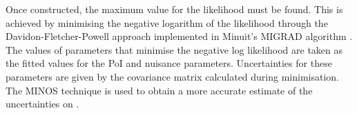 Once constructed, the maximum value for the likelihood must be found. This is
achieved by minimising the negative logarithm of the likelihood through the
Davidon-Fletcher-Powell approach \cite{Davidon1959,Fletcher1970,Powell1983}
implemented in Minuit's MIGRAD algorithm \cite{Minuit2}.
The values of parameters that minimise the negative log likelihood are taken as
the fitted values for the \ac{PoI} and nuisance parameters. Uncertainties for
these parameters are given by the covariance matrix calculated during
minimisation. The MINOS technique \cite{Minuit2} is used to obtain a more
accurate estimate of the uncertainties on \muEW.

